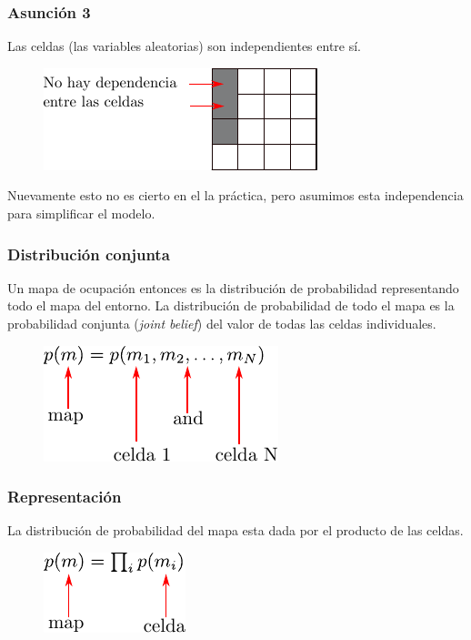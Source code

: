 \begin{frame}
	\frametitle{Asunción 3}
	Las celdas (las variables aleatorias) son independientes entre sí.
	
	\begin{figure}[!h]
		\includegraphics[width=0.7\columnwidth]{./images/grid_map_independency_assumption.pdf}
	\end{figure}
	
	Nuevamente esto no es cierto en el la práctica, pero asumimos esta independencia para simplificar el modelo.
	
\end{frame}

\begin{frame}
    \frametitle{Distribución conjunta}
    
    Un mapa de ocupación entonces es la distribución de probabilidad representando todo el mapa del entorno. La distribución de probabilidad de todo el mapa es la probabilidad conjunta (\emph{joint belief}) del valor de todas las celdas individuales.
    
   	\begin{figure}[!h]
    	\includegraphics[width=0.5\columnwidth]{./images/joint_distribution.pdf}
    \end{figure}
    
\end{frame}

\begin{frame}
    \frametitle{Representación}
    La distribución de probabilidad del mapa esta dada por el producto de las celdas.
    
   	\begin{figure}[!h]
    	\includegraphics[width=0.3\columnwidth]{./images/map_probability_distribution.pdf}
    \end{figure}
    
\end{frame}

